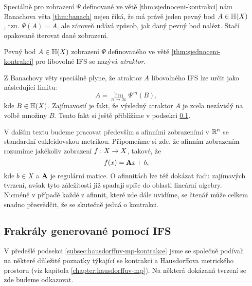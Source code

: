 Speciálně pro zobrazení $\Psi$ definované ve větě \ref{thm:sjednoceni-kontrakci} nám Banachova věta \ref{thm:banach} nejen říká, že má právě jeden pevný bod $A\in\mathbb{H}(X)$, tzn. $\Psi(A)=A$, ale zároveň udává způsob, jak daný pevný bod nalézt. Stačí opakovaně iterovat dané zobrazení.
\begin{definition}[Atraktor]\label{def:atraktor}
    Pevný bod $A\in\mathbb{H}(X)$ zobrazení $\Psi$ definovaného ve větě \ref{thm:sjednoceni-kontrakci} pro libovolné IFS se nazývá \emph{atraktor}.
\end{definition}
Z Banachovy věty speciálně plyne, že atraktor $A$ libovolného IFS lze určit jako následující limitu:
\[A=\lim_{n\to\infty}\Psi^{\circ n}(B),\]
kde $B\in\mathbb{H}(X)$. Zajímavostí je fakt, že výsledný atraktor $A$ je zcela nezávislý na volbě množiny $B$. Tento fakt si ještě přiblížíme v podsekci \ref{subsec:fraktaly-ifs}.

V dalším textu budeme pracovat především s afinními zobrazeními v $\mathbb{R}^n$ se standardní eukleidovskou metrikou. Připomeňme si zde, že afinním zobrazením rozumíme jakékoliv zobrazení $f:X \rightarrow X$, takové, že
\[f(x)=\mathbf{A}x+b,\]
kde $b\in X$ a $\mathbf{A}$ je regulární matice. O afinnitách lze též dokázat řadu zajímavých tvrzení, avšak tyto záležitosti již spadají spíše do oblasti lineární algebry. Nicméně v případě každé z afinnit, které zde dále uvidíme, se čtenář může celkem snadno přesvědčit, že se skutečně jedná o kontrakci.

\subsection{Frakrály generované pomocí IFS}\label{subsec:fraktaly-ifs}

V předešlé podsekci \ref{subsec:hausdorffuv-mp-kontrakce} jsme se společně podívali na některé důležité poznatky týkající se kontrakcí a Hausdorffova metrického prostoru (viz kapitola \ref{chapter:hausdorffuv-mp}). Na některá dokázaná tvrzení se zde budeme odkazovat.

